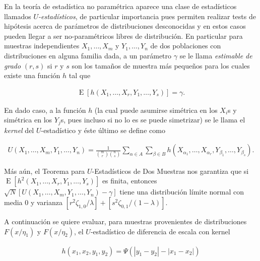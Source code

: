 \documentclass[letter]{article}
\begin{document}


\setlength{\parskip}{8pt}
\setlength{\parindent}{0.5in}


En la teoría de estadística no paramétrica aparece una clase de estadísticos llamados \emph{$U$-estadísticos}, de particular importancia pues permiten realizar tests de hipótesis acerca de parámetros de distribuciones desconocidas y en estos casos pueden llegar a ser no-paramétricos libres de distribución. En particular para muestras independientes $X_1,\dots,X_m$ y $Y_1,\dots,Y_n$ de dos poblaciones con distribuciones en alguna familia dada, a un parámetro $\gamma$ se le llama \emph{estimable de grado} $(r,s)$ si $r$ y $s$ son los tamaños de muestra más pequeños para los cuales existe una función $h$ tal que

\begin{align*}
    \operatorname{E}[h(X_1,\dots,X_r,Y_1,\dots,Y_s)] = \gamma.
\end{align*}

En dado caso, a la función $h$ (la cual puede asumirse simétrica en los $X_i$s y simétrica en los $Y_j$s, pues incluso si no lo es se puede simetrizar) se le llama el \emph{kernel} del $U$-estadístico y éste último se define como

\begin{align*}
    U(X_1,\dots,X_m,Y_1,\dots,Y_n) = \frac{1}{{m \choose r}{n \choose s}}\sum_{\alpha \in A}\sum_{\beta \in B} h(X_{\alpha_1},\dots,X_{\alpha_r},Y_{\beta_1},\dots,Y_{\beta_s}).
\end{align*}

Más aún, el Teorema para $U$-Estadísticos de Dos Muestras nos garantiza que si $\operatorname{E}[h^2(X_1,\dots,X_r,Y_1,\dots,Y_s)]$ es finita, entonces $\sqrt{N}\left[U(X_1,\dots,X_m,Y_1,\dots,Y_n) - \gamma\right]$ tiene una distribución límite normal con media 0 y varianza $[r^2\zeta_{1,0}/\lambda] + [s^2\zeta_{0,1}/(1-\lambda)]$.\cite[Capítulo 3]{Randles1991IntroductionStatistic}

A continuación se quiere evaluar, para muestras provenientes de distribuciones $F(x/\eta_1)$ y $F(x/\eta_2)$, el $U$-estadístico de diferencia de escala con kernel

\begin{align*}
    h(x_1,x_2,y_1,y_2) = \Psi(|y_1 - y_2| - |x_1 - x_2|)
\end{align*}
\end{document}
